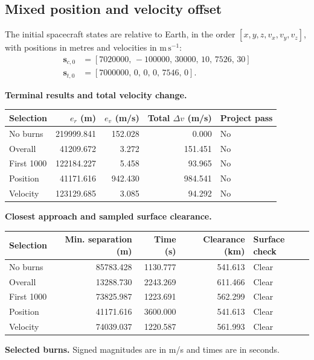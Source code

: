 \subsection{Mixed position and velocity offset}
The initial spacecraft states are relative to Earth, in the order
$[x,y,z,v_x,v_y,v_z]$, with positions in metres and velocities in
$\mathrm{m\,s^{-1}}$:
\begin{align*}
\mathbf s_{c,0}&=[7020000,\,-100000,\,30000,\,10,\,7526,\,30]\\
\mathbf s_{t,0}&=[7000000,\,0,\,0,\,0,\,7546,\,0].
\end{align*}
\par\noindent\textbf{Terminal results and total velocity change.}
\begin{center}
\begin{tabular}{lrrrl}
\toprule
Selection & $e_r$ (m) & $e_v$ (m/s) & Total $\Delta v$ (m/s) & Project pass\\
\midrule
No burns & 219999.841 & 152.028 & 0.000 & No\\
Overall & 41209.672 & 3.272 & 151.451 & No\\
First 1000 & 122184.227 & 5.458 & 93.965 & No\\
Position & 41171.616 & 942.430 & 984.541 & No\\
Velocity & 123129.685 & 3.085 & 94.292 & No\\
\bottomrule
\end{tabular}
\end{center}
\par\noindent\textbf{Closest approach and sampled surface clearance.}
\begin{center}
\begin{tabular}{lrrrl}
\toprule
Selection & Min. separation (m) & Time (s) & Clearance (km) & Surface check\\
\midrule
No burns & 85783.428 & 1130.777 & 541.613 & Clear\\
Overall & 13288.730 & 2243.269 & 611.466 & Clear\\
First 1000 & 73825.987 & 1223.691 & 562.299 & Clear\\
Position & 41171.616 & 3600.000 & 541.613 & Clear\\
Velocity & 74039.037 & 1220.587 & 561.993 & Clear\\
\bottomrule
\end{tabular}
\end{center}
\par\noindent\textbf{Selected burns.} Signed magnitudes are in m/s and times are in seconds.
